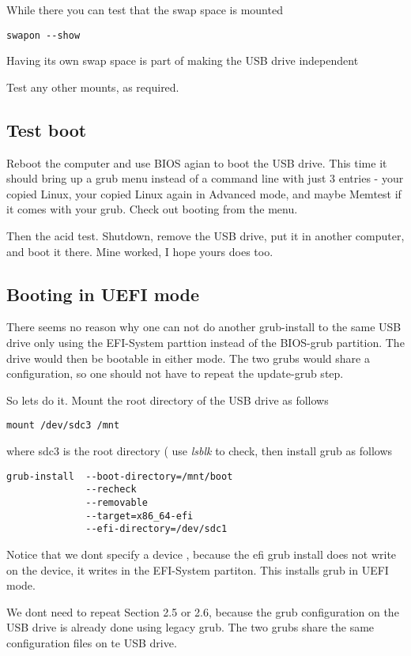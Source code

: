 \documentclass{article}  %
\begin{document}
While there you can test that the swap space is mounted
\begin{verbatim}
swapon --show
\end{verbatim}
Having its own swap space is part of making the USB drive independent

Test any other mounts, as required.

\subsection{Test boot}
Reboot the computer and use BIOS agian to boot the USB drive. This time it should bring up a grub menu instead of a command line with just 3 entries - your copied Linux, your copied Linux again in Advanced mode, and maybe Memtest if it comes with your grub.
Check out booting from the menu.

Then the acid test. Shutdown, remove the USB drive, put it in another computer, and boot it there. Mine worked, I hope yours does too.


\subsection{Booting in UEFI mode}
 There seems no reason why one can not do another grub-install  to the same USB drive only using the EFI-System parttion instead of the BIOS-grub partition. The drive would then be bootable in either mode. The two grubs would share a configuration, so one should not have to repeat the update-grub step.

So lets do it. Mount the root directory of the USB drive as follows
\begin{verbatim}
mount /dev/sdc3 /mnt
\end{verbatim}
 where sdc3 is the root directory ( use {\em lsblk} to check, then install grub as follows
\begin{verbatim}
grub-install  --boot-directory=/mnt/boot
              --recheck
              --removable
              --target=x86_64-efi
              --efi-directory=/dev/sdc1
\end{verbatim}
 Notice that we dont specify a device , because the efi grub install does not write on the device, it writes in the EFI-System partiton.  This installs grub in UEFI mode.

We dont need to repeat Section 2.5 or 2.6, because the grub configuration on the USB drive is already done using legacy grub. The two grubs share the same configuration files on te USB drive.
\end{document}
